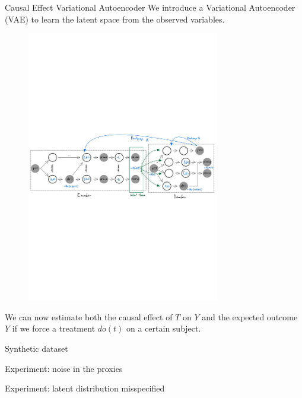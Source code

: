 \documentclass[10pt]{beamer}
\begin{document}
\begin{frame}{Causal Effect Variational Autoencoder}
  We introduce a Variational Autoencoder (VAE) to learn the latent space from the observed variables.  

    \begin{figure}
    \centering
    \includegraphics[width=0.75\textwidth,trim={0 10cm 0 10cm}]{images/cevae_architecture.pdf}
  \end{figure}

    We can now estimate both the causal effect of $T$ on $Y$ and the expected outcome $Y$ if we force a treatment $do(t)$ on a certain subject.
\end{frame}

\begin{frame}{Synthetic dataset}
    
\end{frame}

\begin{frame}{Experiment: noise in the proxies}
    
\end{frame}

\begin{frame}{Experiment: latent distribution misspecified}
    
\end{frame}
\end{document}
